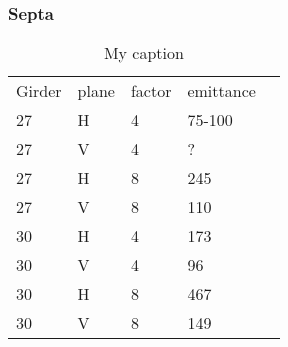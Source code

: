 \subsubsection{Septa}

\begin{table}[]
\centering
\caption{My caption}
\label{my-label}
\begin{tabular}{lllll}
Girder & plane  & factor  & emittance &  \\
27 & H & 4  & 75-100  &  \\ \hline
27& V  & 4 & ? &  \\ \hline
27& H & 8 & 245 &  \\ \hline
27& V & 8 & 110 &  \\ \hline
30 & H & 4  & 173  &  \\ \hline
30& V  & 4 & 96 &  \\ \hline
30& H & 8 & 467 &  \\ \hline
30& V & 8 & 149 &  \\ \hline

\end{tabular}
\end{table}

